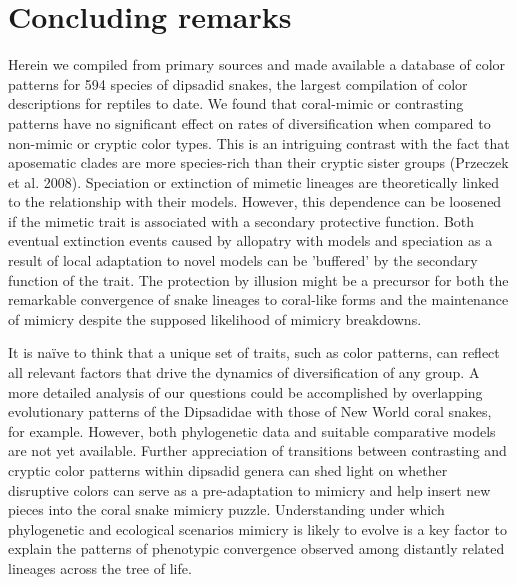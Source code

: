 \section{Concluding remarks}

Herein we compiled from primary sources and made available a database of color patterns for 594 species of dipsadid snakes, the largest compilation of color descriptions for reptiles to date. We found that coral-mimic or contrasting patterns have no significant effect on rates of diversification when compared to non-mimic or cryptic color types. This is an intriguing contrast with the fact that aposematic clades are more species-rich than their cryptic sister groups (Przeczek et al. 2008). Speciation or extinction of mimetic lineages are theoretically linked to the relationship with their models. However, this dependence can be loosened if the mimetic trait is associated with a secondary protective function. Both eventual extinction events caused by allopatry with models and speciation as a result of local adaptation to novel models can be 'buffered' by the secondary function of the trait. The protection by illusion might be a precursor for both the remarkable convergence of snake lineages to coral-like forms and the maintenance of mimicry despite the supposed likelihood of mimicry breakdowns.

It is naïve to think that a unique set of traits, such as color patterns, can reflect all relevant factors that drive the dynamics of diversification of any group. A more detailed analysis of our questions could be accomplished by overlapping evolutionary patterns of the Dipsadidae with those of New World coral snakes, for example. However, both phylogenetic data and suitable comparative models are not yet available. Further appreciation of transitions between contrasting and cryptic color patterns within dipsadid genera can shed light on whether disruptive colors can serve as a pre-adaptation to mimicry and help insert new pieces into the coral snake mimicry puzzle. Understanding under which phylogenetic and ecological scenarios mimicry is likely to evolve is a key factor to explain the patterns of phenotypic convergence observed among distantly related lineages across the tree of life.